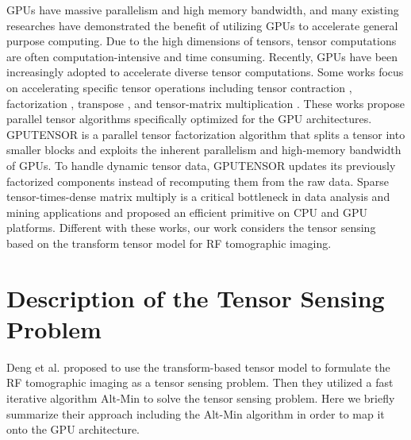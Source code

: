 \documentclass[futureinternet,article,submit,moreauthors,pdftex,10pt,a4paper]{Definitions/mdpi}
\theoremstyle{plain}
\theoremstyle{definition}
\theoremstyle{remark}
\begin{document}
GPUs have massive parallelism and high memory bandwidth, and many existing researches \cite{jing2016energy} \cite{zhang2015buddy} \cite{zhang2015efficient} \cite{zhang2014cuirre} \cite{zhang2016efficient} have demonstrated the benefit of utilizing GPUs to accelerate general purpose computing. Due to the high dimensions of tensors, tensor computations are often computation-intensive and time consuming. Recently, GPUs have been increasingly adopted to accelerate diverse tensor computations. Some works focus on accelerating specific tensor operations including tensor contraction \cite{nelson2015generating} \cite{shi2016tensor}, factorization \cite{antikainen2011nonnegative}, transpose \cite{lyakh2015an} \cite{hynninen2017cutt}, and tensor-matrix multiplication \cite{rogers2016efficient}. These works propose parallel tensor algorithms specifically optimized for the GPU architectures. GPUTENSOR \cite{zou2015gputensor} is a parallel tensor factorization algorithm that splits a tensor into smaller blocks and exploits the inherent parallelism and high-memory bandwidth of GPUs. To handle dynamic tensor data, GPUTENSOR updates its previously factorized components instead of recomputing them from the raw data. Sparse tensor-times-dense matrix multiply is a critical bottleneck in data analysis and mining applications and \cite{li2016optimizing} proposed an efficient primitive on CPU and GPU platforms. Different with these works, our work considers the tensor sensing based on the transform tensor model for RF tomographic imaging.

\section{Description of the Tensor Sensing Problem}
\label{SEC_ALGORITHM}
Deng et al. \cite{deng2018tensor} proposed to use the transform-based tensor model to formulate the RF tomographic imaging as a tensor sensing problem. Then they utilized a fast iterative algorithm Alt-Min to solve the tensor sensing problem. Here we briefly summarize their approach including the Alt-Min algorithm in order to map it onto the GPU architecture.
\end{document}
